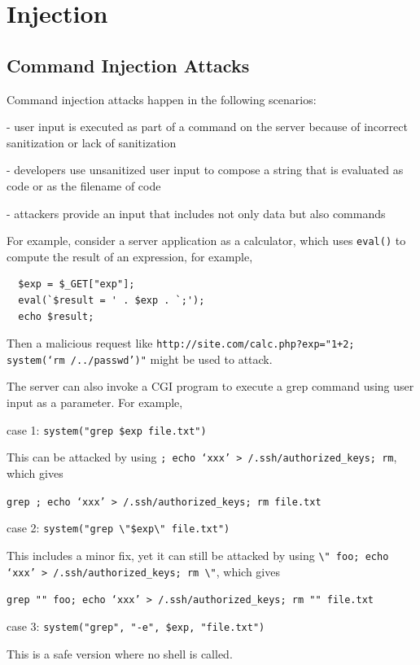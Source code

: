 \section{Injection}

\subsection{Command Injection Attacks}
Command injection attacks happen in the following scenarios: 

- user input is executed as part of a command on the server because of incorrect sanitization or lack of sanitization  

- developers use unsanitized user input to compose a string that is evaluated as code or as the filename of code  

- attackers provide an input that includes not only data but also commands  

For example, consider a server application as a calculator, which uses \texttt{eval()} to compute the result of an expression, for example,

\begin{verbatim}
  $exp = $_GET["exp"];
  eval(`$result = ' . $exp . `;');
  echo $result;
\end{verbatim}

Then a malicious request like \texttt{http://site.com/calc.php?exp="1+2; system(`rm /../passwd')"} might be used to attack. 

The server can also invoke a CGI program to execute a grep command using user input as a parameter. For example,

case 1: \texttt{system("grep \$exp file.txt")}

This can be attacked by using \texttt{; echo `xxx' > /.ssh/authorized\_keys; rm}, which gives

\texttt{grep ; echo `xxx' > /.ssh/authorized\_keys; rm file.txt}

case 2: \texttt{system("grep \textbackslash"\$exp\textbackslash" file.txt")}

This includes a minor fix, yet it can still be attacked by using \texttt{\textbackslash" foo; echo `xxx' > /.ssh/authorized\_keys; rm \textbackslash"}, which gives

\texttt{grep "" foo; echo `xxx' > /.ssh/authorized\_keys; rm "" file.txt}

case 3: \texttt{system("grep", "-e", \$exp, "file.txt")}

This is a safe version where no shell is called. 

